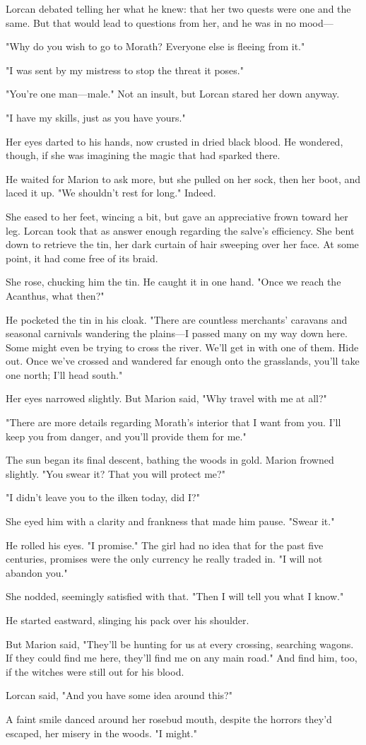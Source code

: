 Lorcan debated telling her what he knew: that her two quests were one and the same. But that would lead to questions from her, and he was in no mood---

"Why do you wish to go to Morath? Everyone else is fleeing from it."

"I was sent by my mistress to stop the threat it poses."

"You're one man---male." Not an insult, but Lorcan stared her down anyway.

"I have my skills, just as you have yours."

Her eyes darted to his hands, now crusted in dried black blood. He wondered, though, if she was imagining the magic that had sparked there.

He waited for Marion to ask more, but she pulled on her sock, then her boot, and laced it up. "We shouldn't rest for long." Indeed.

She eased to her feet, wincing a bit, but gave an appreciative frown toward her leg. Lorcan took that as answer enough regarding the salve's efficiency. She bent down to retrieve the tin, her dark curtain of hair sweeping over her face. At some point, it had come free of its braid.

She rose, chucking him the tin. He caught it in one hand. "Once we reach the Acanthus, what then?"

He pocketed the tin in his cloak. "There are countless merchants' caravans and seasonal carnivals wandering the plains---I passed many on my way down here. Some might even be trying to cross the river. We'll get in with one of them. Hide out. Once we've crossed and wandered far enough onto the grasslands, you'll take one north; I'll head south."

Her eyes narrowed slightly. But Marion said, "Why travel with me at all?"

"There are more details regarding Morath's interior that I want from you. I'll keep you from danger, and you'll provide them for me."

The sun began its final descent, bathing the woods in gold. Marion frowned slightly. "You swear it? That you will protect me?"

"I didn't leave you to the ilken today, did I?"

She eyed him with a clarity and frankness that made him pause. "Swear it."

He rolled his eyes. "I promise." The girl had no idea that for the past five centuries, promises were the only currency he really traded in. "I will not abandon you."

She nodded, seemingly satisfied with that. "Then I will tell you what I know."

He started eastward, slinging his pack over his shoulder.

But Marion said, "They'll be hunting for us at every crossing, searching wagons. If they could find me here, they'll find me on any main road." And find him, too, if the witches were still out for his blood.

Lorcan said, "And you have some idea around this?"

A faint smile danced around her rosebud mouth, despite the horrors they'd escaped, her misery in the woods. "I might."
